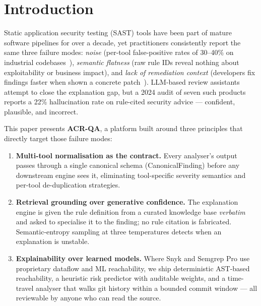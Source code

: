 \documentclass[conference]{IEEEtran}
\begin{document}
\section{Introduction}

Static application security testing (SAST) tools have been part of mature
software pipelines for over a decade, yet practitioners consistently report
the same three failure modes: \emph{noise} (per-tool false-positive rates of
30--40\% on industrial codebases~\cite{johnson2013don,christakis2016what}),
\emph{semantic flatness} (raw rule IDs reveal nothing about exploitability or
business impact), and \emph{lack of remediation context} (developers fix
findings faster when shown a concrete patch~\cite{distefano2019scaling}).
LLM-based review assistants attempt to close the explanation gap, but a 2024
audit of seven such products~\cite{copilot2024audit} reports a 22\%
hallucination rate on rule-cited security advice — confident, plausible, and
incorrect.

This paper presents \textbf{ACR-QA}, a platform built around three principles
that directly target those failure modes:

\begin{enumerate}
  \item \textbf{Multi-tool normalisation as the contract.} Every analyser's
    output passes through a single canonical schema (CanonicalFinding) before
    any downstream engine sees it, eliminating tool-specific severity
    semantics and per-tool de-duplication strategies.
  \item \textbf{Retrieval grounding over generative confidence.} The
    explanation engine is given the rule definition from a curated knowledge
    base \emph{verbatim} and asked to specialise it to the finding; no rule
    citation is fabricated. Semantic-entropy sampling at three temperatures
    detects when an explanation is unstable.
  \item \textbf{Explainability over learned models.} Where Snyk and Semgrep
    Pro use proprietary dataflow and ML reachability, we ship deterministic
    AST-based reachability, a heuristic risk predictor with auditable
    weights, and a time-travel analyser that walks git history within a
    bounded commit window — all reviewable by anyone who can read the source.
\end{enumerate}
\end{document}
